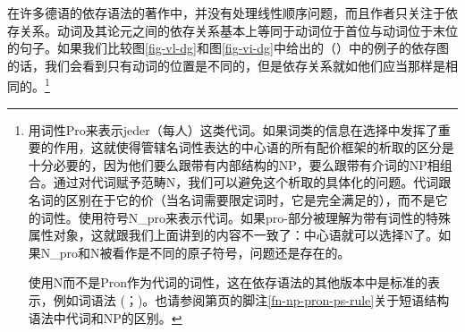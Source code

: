 \largerpage[-1]
在许多德语的依存语法的著作中，并没有处理线性顺序问题，而且作者只关注于依存关系。动词及其论元之间的依存关系基本上等同于动词位于首位与动词位于末位的句子。如果我们比较图\ref{fig-vl-dg}和图\ref{fig-vi-dg}中给出的（）中的例子的依存图的话，我们会看到只有动词的位置是不同的，但是依存关系就如他们应当那样是相同的。\footnote{
\citet{Eroms2000a}用词性Pro来表示jeder（每人）这类代词。如果词类的信息在选择中发挥了重要的作用，这就使得管辖名词性表达的中心语的所有配价框架的析取的区分是十分必要的，因为他们要么跟带有内部结构的NP，要么跟带有介词的NP相组合。通过对代词赋予范畴N，我们可以避免这个析取的具体化的问题。代词跟名词的区别在于它的价（当名词需要限定词时，它是完全满足的），而不是它的词性。\citet[]{EH2003a}使用符号N\_pro来表示代词。如果pro-部分被理解为带有词性的特殊属性对象，这就跟我们上面讲到的内容不一致了：中心语就可以选择N了。如果N\_pro和N被看作是不同的原子符号，问题还是存在的。

使用N而不是Pron作为代词的词性，这在依存语法的其他版本中是标准的表示，例如词语法 (\citealp[]{Hudson90a-u}；\citealp[]{Hudson2007a-u})。也请参阅第\pageref{fn-np-pron-ps-rule}页的脚注\ref{fn-np-pron-ps-rule}关于短语结构语法中代词和NP的区别。
}
